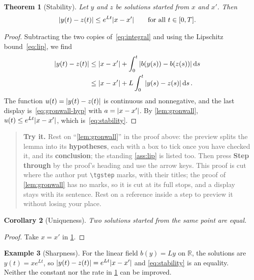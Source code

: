 \documentclass{amsart}
\newtheorem{theorem}{Theorem}[section]
\newtheorem{corollary}[theorem]{Corollary}
\theoremstyle{definition}
\newtheorem{example}[theorem]{Example}
\theoremstyle{remark}
\numberwithin{equation}{section}
\newenvironment{tryit}{\begin{quote}\small\textbf{Try it.}}{\end{quote}}
\newcommand{\R}{\mathbb{R}}
\begin{document}
\begin{theorem}[Stability]\label{thm:stability}
Let $y$ and $z$ be solutions started from $x$ and $x'$. Then
\begin{equation}\label{eq:stability}
  \abs{y(t) - z(t)} \le e^{Lt} \abs{x - x'} \qquad \text{for all } t \in [0, T].
\end{equation}
\end{theorem}

\begin{proof}
Subtracting the two copies of~\eqref{eq:integral} and using the Lipschitz
bound~\eqref{eq:lip}, we find
\begin{align*}
  \abs{y(t) - z(t)}
    &\le \abs{x - x'} + \int_0^t \abs{b\qty(y(s)) - b\qty(z(s))} \dd{s} \\
    &\le \abs{x - x'} + L \int_0^t \abs{y(s) - z(s)} \dd{s} .
\end{align*}
The function $u(t) = \abs{y(t) - z(t)}$ is continuous and nonnegative, and
the last display is~\eqref{eq:gronwall-hyp} with $a = \abs{x - x'}$. By
\cref{lem:gronwall}, $u(t) \le e^{Lt} \abs{x - x'}$, which
is~\eqref{eq:stability}.
\end{proof}

\begin{tgonly}
\begin{tryit}
Rest on ``\cref{lem:gronwall}'' in the proof above: the preview splits the
lemma into its \textbf{hypotheses}, each with a box to tick once you have
checked it, and its \textbf{conclusion}; the standing
\cref{ass:lip} is listed too. Then press \textbf{Step through} by the proof's
heading and use the arrow keys. This proof is cut where the author put
\verb|\tgstep| marks, with their titles; the proof of \cref{lem:gronwall}
has no marks, so it is cut at its full stops, and a display stays with its
sentence. Rest on a reference inside a step to preview it without losing
your place.
\end{tryit}
\end{tgonly}

\begin{corollary}[Uniqueness]\label{cor:unique}
Two solutions started from the same point are equal.
\end{corollary}

\begin{proof}
Take $x = x'$ in \cref{thm:stability}.
\end{proof}

\begin{example}[Sharpness]\label{ex:sharp}
%
For the linear field $b(y) = L y$ on $\R$, the solutions are
$y(t) = x e^{Lt}$, so $\abs{y(t) - z(t)} = e^{Lt} \abs{x - x'}$ and
\eqref{eq:stability} is an equality. Neither the constant nor the rate in
\cref{thm:stability} can be improved.
\end{example}
\end{document}
